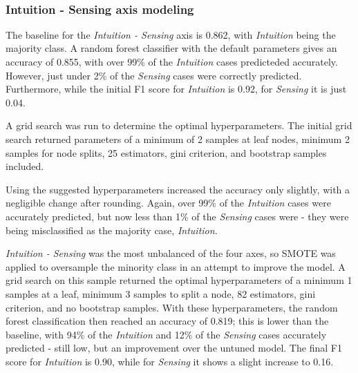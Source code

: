 \documentclass[11pt]{article}
\begin{document}
    \begin{center}
    \end{center}
    { \hspace*{\fill} \\}
    
    \subsubsection{Intuition - Sensing axis
modeling}\label{intuition---sensing-axis-modeling}

    The baseline for the \emph{Intuition - Sensing} axis is 0.862, with
\emph{Intuition} being the majority class. A random forest classifier
with the default parameters gives an accuracy of 0.855, with over 99\%
of the \emph{Intuition} cases predicteded accurately. However, just
under 2\% of the \emph{Sensing} cases were correctly predicted.
Furthermore, while the initial F1 score for \emph{Intuition} is 0.92,
for \emph{Sensing} it is just 0.04.

A grid search was run to determine the optimal hyperparameters. The
initial grid search returned parameters of a minimum of 2 samples at
leaf nodes, minimum 2 samples for node splits, 25 estimators, gini
criterion, and bootstrap samples included.

Using the suggested hyperparameters increased the accuracy only
slightly, with a negligible change after rounding. Again, over 99\% of
the \emph{Intuition} cases were accurately predicted, but now less than
1\% of the \emph{Sensing} cases were - they were being misclassified as
the majority case, \emph{Intuition}.

\emph{Intuition - Sensing} was the most unbalanced of the four axes, so
SMOTE was applied to oversample the minority class in an attempt to
improve the model. A grid search on this sample returned the optimal
hyperparameters of a minimum 1 samples at a leaf, minimum 3 samples to
split a node, 82 estimators, gini criterion, and no bootstrap samples.
With these hyperparameters, the random forest classification then
reached an accuracy of 0.819; this is lower than the baseline, with 94\%
of the \emph{Intuition} and 12\% of the \emph{Sensing} cases accurately
predicted - still low, but an improvement over the untuned model. The
final F1 score for \emph{Intuition} is 0.90, while for \emph{Sensing} it
shows a slight increase to 0.16.
\end{document}
